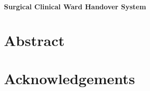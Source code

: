 \begin{center}
\Large\bfseries
Surgical Clinical Ward Handover System
\end{center}

\section*{Abstract}

\section*{Acknowledgements}
